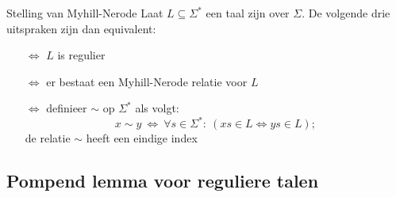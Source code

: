 \begin{lem}{Stelling van Myhill-Nerode}
    \vspace{-0.1cm}
    Laat $L \subseteq \Sigma^*$ een taal zijn over $\Sigma$. De volgende drie uitspraken zijn dan equivalent:
    \begin{itemize}
        \item[$\Leftrightarrow$] $L$ is regulier
        \item[$\Leftrightarrow$] er bestaat een Myhill-Nerode relatie voor $L$
        \item[$\Leftrightarrow$] 
            definieer $\sim$ op $\Sigma^*$ als volgt:
            \vspace{-0.15cm}
            \begin{equation*}
                x \sim y \ \Leftrightarrow \ \forall s \in \Sigma^*: \ ( xs \in L \Leftrightarrow ys \in L );
            \end{equation*}
            \vspace{-0.15cm}
            de relatie $\sim$ heeft een eindige index
    \end{itemize}
    \vspace{-0.3cm}
\end{lem}   

\subsection{Pompend lemma voor reguliere talen}

\vspace{0.5cm}

